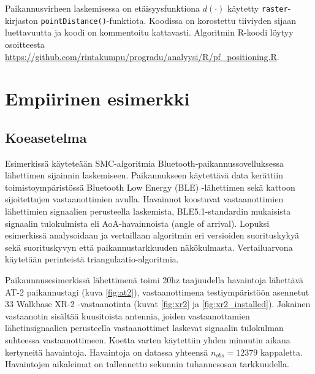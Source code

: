 \documentclass[
  12pt,
  a4paper, twoside]{book}
\begin{document}
Paikannusvirheen laskemisessa on etäisyysfunktiona \(d(\cdot)\) käytetty \texttt{raster}-kirjaston \texttt{pointDistance()}-funktiota. Koodissa on korostettu tiiviyden sijaan luettavuutta ja koodi on kommentoitu kattavasti. Algoritmin R-koodi löytyy osoitteesta \url{https://github.com/rintakumpu/progradu/analyysi/R/pf_positioning.R}.

\section{Empiirinen esimerkki} \label{empiirinen-esimerkki}

\subsection{Koeasetelma}

Esimerkissä käyteteään SMC-algoritmia Bluetooth-paikannussovelluksessa lähettimen sijainnin laskemiseen. Paikannukseen käytettävä data kerättiin toimistoympäristössä Bluetooth Low Energy (BLE) -lähettimen sekä kattoon sijoitettujen vastaanottimien avulla. Havainnot koostuvat vastaanottimien lähettimien signaalien perusteella laskemista, BLE5.1-standardin mukaisista signaalin tulokulmista eli AoA-havainnoista (angle of arrival). Lopuksi esimerkissä analysoidaan ja vertaillaan algoritmin eri versioiden suorituskykyä sekä suorituskyvyn että paikannustarkkuuden näkökulmasta. Vertailuarvona käytetään perinteistä triangulaatio-algoritmia.

Paikaunnusesimerkissä lähettimenä toimi 20hz taajuudella havaintoja lähettävä AT-2 paikannustagi (kuva \ref{fig:at2}), vastaanottimena testiympäristöön asennetut 33 Walkbase XR-2 -vastaanotinta (kuvat \ref{fig:xr2} ja \ref{fig:xr2_installed}). Jokainen vastaanotin sisältää kuusitoista antennia, joiden vastaanottamien lähetinsignaalien perusteella vastaanottimet laskevat signaalin tulokulman suhteessa vastaanottimeen. Koetta varten käytettiin yhden minuutin aikana kertyneitä havaintoja. Havaintoja on datassa yhteensä \(n_{obs}=12379\) kappaletta. Havaintojen aikaleimat on tallennettu sekunnin tuhannesosan tarkkuudella.
\end{document}
